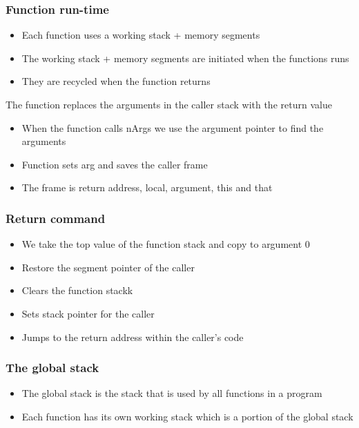 \documentclass[12pt,a4paper]{article}
\begin{document}
\subsubsection{Function run-time}
\begin{itemize}
    \item Each function uses a working stack + memory segments
    \item The working stack + memory segments are initiated when the functions runs 
    \item They are recycled when the function returns
\end{itemize}

The function replaces the arguments in the caller stack with the return value
\begin{itemize}
    \item When the function calls nArgs we use the argument pointer to find the arguments
    \item Function sets arg and saves the caller frame
    \item The frame is return address, local, argument, this and that
\end{itemize}

\subsubsection{Return command}
\begin{itemize}
    \item We take the top value of the function stack and copy to argument 0
    \item Restore the segment pointer of the caller
    \item Clears the function stackk
    \item Sets stack pointer for the caller
    \item Jumps to the return address within the caller's code
\end{itemize}

\subsubsection{The global stack}
\begin{itemize}
    \item The global stack is the stack that is used by all functions in a program
    \item Each function has its own working stack which is a portion of the global stack
\end{itemize}
\newpage
\end{document}
